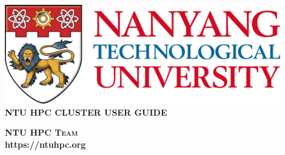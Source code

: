 \begin{titlepage}
\begin{center}

\includegraphics[width=0.9\textwidth]{images/ntu_logo.png}
\\[5cm]

\uppercase{\textbf{NTU HPC Cluster User Guide}}
\\[5cm]

\uppercase{
\textbf{
}}

\vfill

\textsc{\bfseries NTU HPC Team}
\\
\textbf{https://ntuhpc.org}

\end{center}
\end{titlepage}
